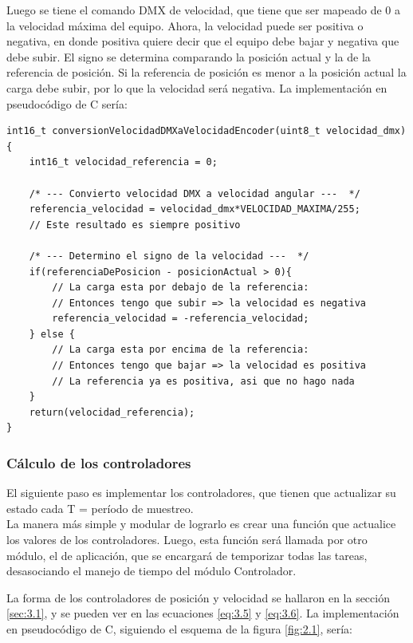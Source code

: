Luego se tiene el comando DMX de velocidad, que tiene que ser mapeado de 0 a la velocidad máxima del equipo. Ahora, la velocidad puede ser positiva o negativa, en donde positiva quiere decir que el equipo debe bajar y negativa que debe subir. El signo se determina comparando la posición actual y la de la referencia de posición. Si la referencia de posición es menor a la posición actual la carga debe subir, por lo que la velocidad será negativa. La implementación en pseudocódigo de C sería:
\begin{lstlisting}[style=CStyle]
int16_t conversionVelocidadDMXaVelocidadEncoder(uint8_t velocidad_dmx){
	int16_t velocidad_referencia = 0;
	
	/* --- Convierto velocidad DMX a velocidad angular ---  */
	referencia_velocidad = velocidad_dmx*VELOCIDAD_MAXIMA/255;
	// Este resultado es siempre positivo
	
	/* --- Determino el signo de la velocidad ---  */
	if(referenciaDePosicion - posicionActual > 0){
		// La carga esta por debajo de la referencia:
		// Entonces tengo que subir => la velocidad es negativa
		referencia_velocidad = -referencia_velocidad;
	} else {
		// La carga esta por encima de la referencia:
		// Entonces tengo que bajar => la velocidad es positiva
		// La referencia ya es positiva, asi que no hago nada 
	}
	return(velocidad_referencia);
}
\end{lstlisting}

\subsubsection{Cálculo de los controladores}
El siguiente paso es implementar los controladores, que tienen que actualizar su estado cada T = período de muestreo. \\
La manera más simple y modular de lograrlo es crear una función que actualice los valores de los controladores. Luego, esta función será llamada por otro módulo, el de aplicación, que se encargará de temporizar todas las tareas, desasociando el manejo de tiempo del módulo Controlador.

La forma de los controladores de posición y velocidad se hallaron en la sección \ref{sec:3.1}, y se pueden ver en las ecuaciones \ref{eq:3.5} y \ref{eq:3.6}. La implementación en pseudocódigo de C, siguiendo el esquema de la figura \ref{fig:2.1}, sería:

